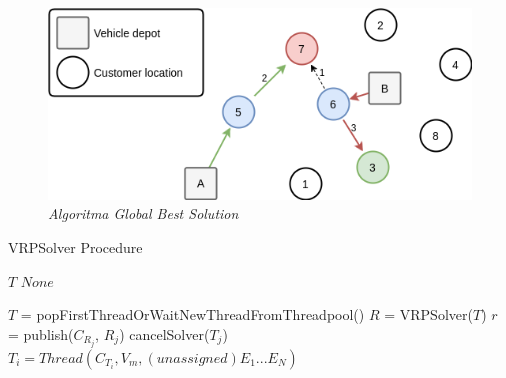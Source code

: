 \begin{figure}[!]
	\centering
	\includegraphics[width=12cm]{Resources/Images/global-best-greedy-solution}
	\caption{\textit{Algoritma \textit{Global Best Solution}}}
	\label{fig:global-best-greedy-solution}
\end{figure}


\begin{algorithm}[!]
	\caption{VRPSolver Procedure}
	\label{alg:vrp-worker}
	\begin{algorithmic}[1]
		\renewcommand{\algorithmicrequire}{\textbf{Input:}}
		\renewcommand{\algorithmicensure}{\textbf{Output:}}
		\REQUIRE $T$
		\ENSURE  $None$
		
			\STATE $T$ = popFirstThreadOrWaitNewThreadFromThreadpool()
			\STATE $R$ = VRPSolver($T$)
				\STATE $r$ = publish($C_{R_j}$, $R_j$)
					\STATE cancelSolver($T_j$)
					\STATE $T_i = Thread(C_{T_i}, V_m, (unassigned) E_1...E_N)$
				\ENDIF
			\ENDFOR
		\ENDWHILE		
	\end{algorithmic}
\end{algorithm}


